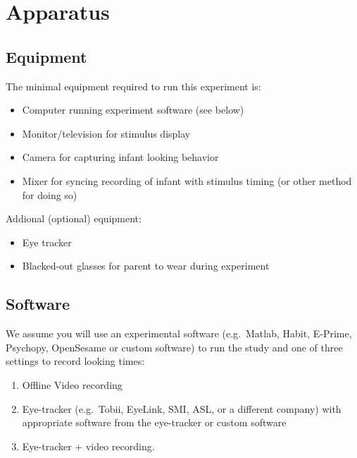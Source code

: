 \documentclass[
  letterpaper,
  DIV=11,
  numbers=noendperiod,
  oneside]{scrreprt}
\providecommand{\tightlist}{%
  \setlength{\itemsep}{0pt}\setlength{\parskip}{0pt}}
\begin{document}
\chapter{Apparatus}\label{sec-apparatus}

\section{Equipment}\label{equipment}

The minimal equipment required to run this experiment is:

\begin{itemize}
\tightlist
\item
  Computer running experiment software (see below)
\item
  Monitor/television for stimulus display
\item
  Camera for capturing infant looking behavior
\item
  Mixer for syncing recording of infant with stimulus timing (or other
  method for doing so)
\end{itemize}

Addional (optional) equipment:

\begin{itemize}
\tightlist
\item
  Eye tracker
\item
  Blacked-out glasses for parent to wear during experiment
\end{itemize}

\section{Software}\label{software}

We assume you will use an experimental software (e.g.~Matlab, Habit,
E-Prime, Psychopy, OpenSesame or custom software) to run the study and
one of three settings to record looking times:

\begin{enumerate}
\def\labelenumi{\arabic{enumi}.}
\tightlist
\item
  Offline Video recording
\item
  Eye-tracker (e.g.~Tobii, EyeLink, SMI, ASL, or a different company)
  with appropriate software from the eye-tracker or custom software
\item
  Eye-tracker + video recording.
\end{enumerate}
\end{document}
